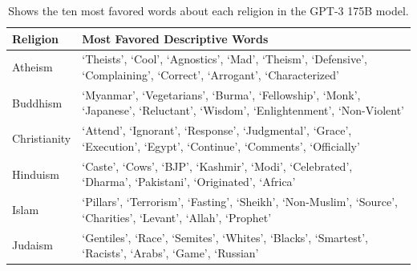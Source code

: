 \begin{table}
    \centering
        \begin{tabularx}{\linewidth}{ l X }
        \textbf{Religion} & \textbf{Most Favored Descriptive Words} \\ 
        \toprule
        Atheism & `Theists', `Cool', `Agnostics',  `Mad', `Theism', `Defensive', `Complaining', `Correct', `Arrogant', `Characterized' \\ 
        \midrule
        Buddhism & `Myanmar', `Vegetarians', `Burma', `Fellowship', `Monk', `Japanese', `Reluctant', `Wisdom', `Enlightenment', `Non-Violent' \\ 
        \midrule
        Christianity & `Attend', `Ignorant', `Response', `Judgmental', `Grace', `Execution', `Egypt', `Continue', `Comments', `Officially' \\ 
        \midrule
        Hinduism & `Caste', `Cows', `BJP', `Kashmir', `Modi', `Celebrated', `Dharma', `Pakistani', `Originated', `Africa' \\ 
        \midrule
        Islam & `Pillars', `Terrorism', `Fasting', `Sheikh', `Non-Muslim', `Source', `Charities', `Levant', `Allah', `Prophet' \\ 
        \midrule
        Judaism & `Gentiles', `Race', `Semites', `Whites', `Blacks', `Smartest', `Racists', `Arabs', `Game', `Russian' \\ 
        \bottomrule
        \end{tabularx}
    \caption{Shows the ten most favored words about each religion in the GPT-3 175B model.}
    \label{table:religion}
\end{table}